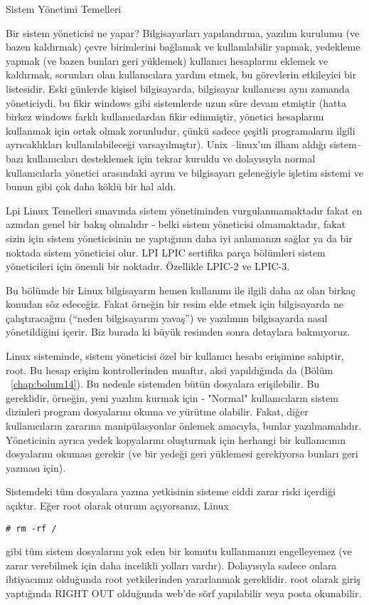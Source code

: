 \begin{section}{Sistem Yönetimi Temelleri}

Bir sistem yöneticisi ne yapar? Bilgisayarları yapılandırma, yazılım kurulumu (ve bazen kaldırmak) çevre birimlerini bağlamak ve kullanılabilir yapmak, yedekleme yapmak (ve bazen bunları geri yüklemek) kullanıcı hesaplarını eklemek ve kaldırmak, sorunları olan kullanıcılara yardım etmek, bu görevlerin etkileyici bir listesidir. Eski günlerde kişisel bilgisayarda, bilgisayar kullanıcısı aynı zamanda yöneticiydi. bu fikir windows gibi sistemlerde uzun süre devam etmiştir (hatta birkez windows farklı kullanıcılardan fikir edinmiştir, yönetici hesaplarını kullanmak için ortak olmak zorunludur, çünkü sadece çeşitli programaların ilgili ayrıcaklıkları kullanılabileceği varsayılmıştır). Unix --linux'un ilham aldığı sistem-- bazı kullanıcıları desteklemek için tekrar kuruldu ve dolayısıyla normal kullanıcılarla yönetici arasındaki ayrım ve bilgisayarı geleneğiyle işletim sistemi ve bunun gibi çok daha köklü bir hal aldı.

Lpi Linux Temelleri sınavında sistem yönetiminden vurgulanmamaktadır fakat en azından genel bir bakış olmalıdır - belki sistem yöneticisi olmamaktadır, fakat sizin için sistem yöneticisinin ne yaptığının daha iyi anlamanızı sağlar ya da bir noktada sistem yöneticisi olur. LPI LPIC sertifika parça bölümleri sistem yöneticileri için önemli bir noktadır. Özellikle LPIC-2 ve LPIC-3. 

Bu bölümde bir Linux bilgisayarın hemen kullanımı ile ilgili daha az olan birkaç konudan söz edeceğiz. Fakat  örneğin bir resim  elde etmek için bilgisayarda ne çalıştıracağını (“neden  bilgisayarım yavaş”)  ve yazılımın bilgisayarda nasıl yönetildiğini içerir. Biz burada ki büyük resimden sonra detaylara bakmıyoruz.  

Linux sisteminde, sistem yöneticisi özel bir kullanıcı hesabı erişimine sahiptir, root. Bu hesap erişim kontrollerinden muaftır, aksi yapıldığında da (Bölüm ~\ref{chap:bolum14}). Bu nedenle sistemden  bütün dosyalara erişilebilir. Bu gereklidir, örneğin, yeni yazılım kurmak için - "Normal" kullanıcıların sistem dizinleri program dosyalarını okuma ve yürütme olabilir. Fakat, diğer kullanıcıların zararına manipülasyonlar önlemek amacıyla, bunlar yazılmamalıdır. Yöneticinin ayrıca yedek kopyalarını oluşturmak için herhangi bir kullanıcının dosyalarını okuması gerekir (ve bir yedeği geri yüklemesi gerekiyorsa bunları geri yazması için).

Sistemdeki tüm dosyalara yazma yetkisinin sisteme ciddi zarar riski içerdiği açıktır. Eğer root olarak oturum açıyorsanız, Linux
\begin{verbatim}
# rm -rf /
\end{verbatim}
gibi  tüm sistem dosyalarını yok eden bir komutu kullanmanızı engelleyemez (ve zarar verebilmek için daha incelikli yolları vardır). Dolayısıyla sadece onlara ihtiyacımız olduğunda root yetkilerinden yararlanmak gereklidir. root  olarak giriş yaptığında  RIGHT OUT olduğunda web'de sörf  yapılabilir veya posta okunabilir.


\end{section}
